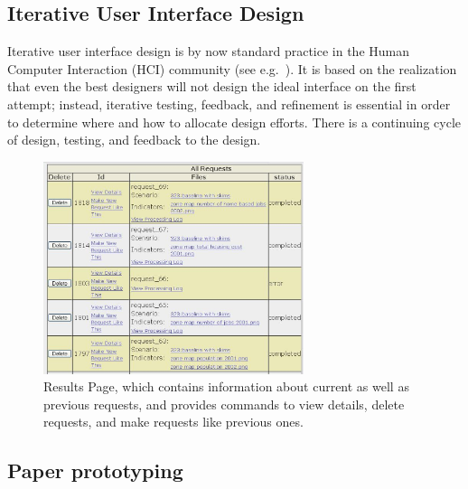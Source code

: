 \subsection{Iterative User Interface Design}

Iterative user interface design is by now standard practice in the Human Computer
Interaction (HCI)
community (see e.g.\ \cite{nielsen-ieee-computer-1993}).  It is based on
the realization that even the best designers will not design the ideal
interface on the first attempt; instead, iterative testing, feedback, and
refinement is essential in order to determine where and how to allocate
design efforts.  There is a continuing cycle of design, testing, and
feedback to the design.

\begin{figure}
\centering
\includegraphics[width =3in]{figs/results}

\caption{\label{fig:results} Results Page, which contains
information about current as well as previous requests, and provides
commands to view details, delete requests, and make requests like
previous ones.}
\end{figure}

\subsection{Paper prototyping}


